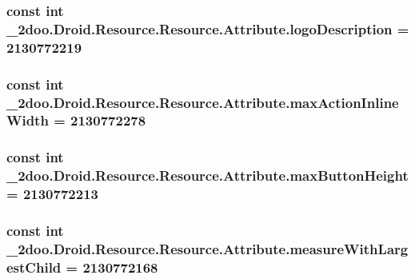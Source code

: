 \hypertarget{class__2doo_1_1_droid_1_1_resource_1_1_attribute_0ce0e3a921d775a79a2c8017b7c9d7c2}{
\subsubsection[{logoDescription}]{\setlength{\rightskip}{0pt plus 5cm}const int \_\-2doo.Droid.Resource.Resource.Attribute.logoDescription = 2130772219}}
\label{class__2doo_1_1_droid_1_1_resource_1_1_attribute_0ce0e3a921d775a79a2c8017b7c9d7c2}


\hypertarget{class__2doo_1_1_droid_1_1_resource_1_1_attribute_0bd69ce31571df224793eaf98adc1a9f}{
\subsubsection[{maxActionInlineWidth}]{\setlength{\rightskip}{0pt plus 5cm}const int \_\-2doo.Droid.Resource.Resource.Attribute.maxActionInlineWidth = 2130772278}}
\label{class__2doo_1_1_droid_1_1_resource_1_1_attribute_0bd69ce31571df224793eaf98adc1a9f}


\hypertarget{class__2doo_1_1_droid_1_1_resource_1_1_attribute_1bc19d69afc3c5532acdcc18083c7da7}{
\subsubsection[{maxButtonHeight}]{\setlength{\rightskip}{0pt plus 5cm}const int \_\-2doo.Droid.Resource.Resource.Attribute.maxButtonHeight = 2130772213}}
\label{class__2doo_1_1_droid_1_1_resource_1_1_attribute_1bc19d69afc3c5532acdcc18083c7da7}


\hypertarget{class__2doo_1_1_droid_1_1_resource_1_1_attribute_0872c2dbb6e059c0219555216475d0df}{
\subsubsection[{measureWithLargestChild}]{\setlength{\rightskip}{0pt plus 5cm}const int \_\-2doo.Droid.Resource.Resource.Attribute.measureWithLargestChild = 2130772168}}
\label{class__2doo_1_1_droid_1_1_resource_1_1_attribute_0872c2dbb6e059c0219555216475d0df}


